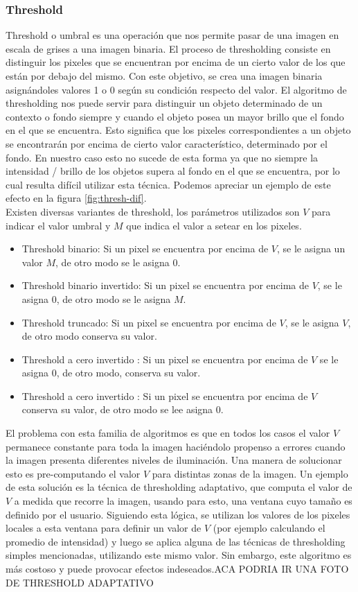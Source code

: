 	\subsubsection{Threshold}
Threshold o umbral es una operación que nos permite pasar de una imagen en escala de grises a una imagen binaria. El proceso de thresholding consiste en distinguir los pixeles que se encuentran por encima de un cierto valor de los que están por debajo del mismo. Con este objetivo, se crea una imagen binaria asignándoles valores 1 o 0 según su condición respecto del valor. El algoritmo de thresholding nos puede servir para distinguir un objeto determinado de un contexto o fondo siempre y cuando el objeto posea un mayor brillo que el fondo en el que se encuentra. Esto significa que los pixeles correspondientes a un objeto se encontrarán por encima de cierto valor característico, determinado por el fondo. En nuestro caso esto no sucede de esta forma ya que no siempre la intensidad / brillo de los objetos supera al fondo en el que se encuentra, por lo cual resulta difícil utilizar esta técnica. Podemos apreciar un ejemplo de este efecto en la figura \ref{fig:thresh-dif}. \\
\indent Existen diversas variantes de threshold, los parámetros utilizados son $V$ para indicar el valor umbral y $M$ que indica el valor a setear en los pixeles.
\begin{itemize}
\item{ Threshold binario:  Si un pixel se encuentra por encima de $V$, se le asigna un valor $M$, de otro modo se le asigna $0$.}
\item{ Threshold binario invertido:  Si un pixel se encuentra por encima de $V$, se le asigna 0, de otro modo se le asigna $M$.}
\item{ Threshold truncado:  Si un pixel se encuentra por encima de $V$, se le asigna $V$, de otro modo conserva su valor.}
\item{ Threshold a cero invertido : Si un pixel se encuentra por encima de $V$ se le asigna $0$, de otro modo, conserva su valor.}
\item{ Threshold a cero invertido : Si un pixel se encuentra por encima de $V$ conserva su valor, de otro modo se lee asigna $0$.}
\end{itemize}
El problema con esta familia de algoritmos es que en todos los casos el valor $V$ permanece constante para toda la imagen haciéndolo propenso a errores cuando la imagen presenta diferentes niveles de iluminación. Una manera de solucionar esto es pre-computando el valor $V$ para distintas zonas de la imagen. Un ejemplo de esta solución es la técnica de thresholding adaptativo, que computa el valor de $V$ a medida que recorre la imagen, usando para esto, una ventana cuyo tamaño es definido por el usuario. Siguiendo esta lógica, se utilizan los valores de los pixeles locales a esta ventana para definir un valor de $V$ (por ejemplo calculando el promedio de intensidad) y luego se aplica alguna de las técnicas de thresholding simples mencionadas, utilizando este mismo valor. Sin embargo, este algoritmo es más costoso y puede provocar efectos indeseados.ACA PODRIA IR UNA FOTO DE THRESHOLD ADAPTATIVO\\
